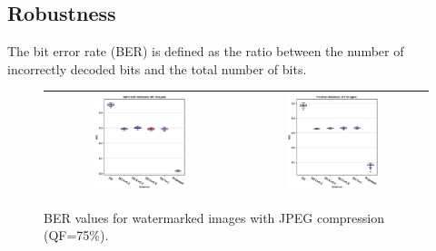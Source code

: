 \documentclass[runningheads]{llncs}
\begin{document}
\subsection{Robustness}
The bit error rate (BER) is defined as the ratio between the number of incorrectly decoded bits and the total number of bits.
\begin{figure}[H]
	\begin{center}
		\begin{tabular}{|c|c|}\hline
			\includegraphics[width=0.5\textwidth]{BER75SaintGall.eps}
			&\includegraphics[width=0.5\textwidth]{BER75Parzival.eps}\\\hline
		\end{tabular}
	\end{center}
	\caption{BER values for watermarked images with JPEG compression (QF=75\%).}
	\label{ber75}
\end{figure}
\end{document}
